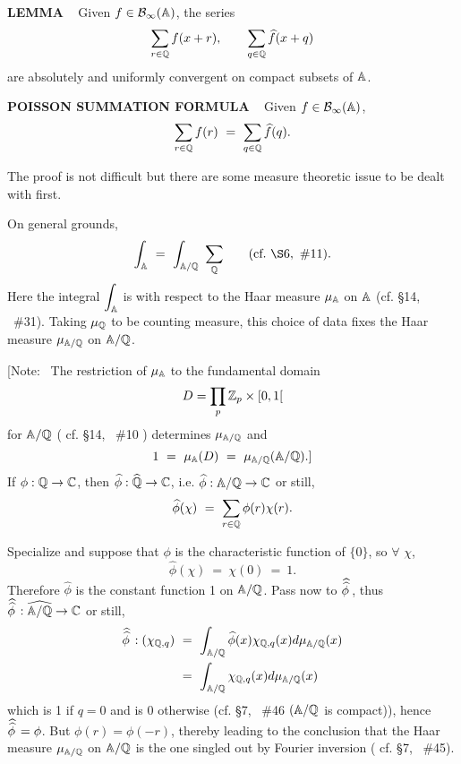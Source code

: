 \vspace{0.11cm}


\begin{x}{\small\bf LEMMA} \ %
Given $f \in \mathcal{B}_\infty(\mathbb{A})$, the series
\[
\sum_{r \in \mathbb{Q}} f(x+r),  \qquad \sum_{q \in \mathbb{Q}} \widehat{f}(x+q)
\]
are absolutely and uniformly convergent on compact subsets of $\mathbb{A}$.
\end{x}

\vspace{0.1cm}

\begin{x}{\small\bf POISSON SUMMATION FORMULA} \ %
Given $f \in \mathcal{B}_\infty(\mathbb{A})$,
\[
\sum_{r \in \mathbb{Q}} f(r) \ = \  \sum_{q \in \mathbb{Q}} \widehat{f}(q).
\]

The proof is not difficult but there are some measure theoretic issue to be dealt with first.

On general grounds, 
\[
\int_\A \ =\  \int_{\A/\Q} \ \sum_\Q	\qquad (\text{cf.} \ \S6,  \ \#11).
\]
Here the integral $\displaystyle\int_{\mathbb{A}}$ is with respect to the Haar measure $\mu_{\mathbb{A}}$ on $\mathbb{A}$ (cf. \S14, \  \#31).  
Taking $\mu_{\mathbb{Q}}$ to be counting measure, this choice of data fixes the Haar measure $\mu_{\mathbb{A}/\mathbb{Q}}$ on $\mathbb{A}/\mathbb{Q}$.

\vspace{0.1cm}

[Note: \  The restriction of $\mu_{\mathbb{A}}$ to the fundamental domain
\[
D = \prod_p \mathbb{Z}_p \times [0,1[
\]
for $\mathbb{A}/\mathbb{Q}$ ( cf. \S14, \  \#10 ) determines $\mu_{\mathbb{A}/\mathbb{Q}}$ and
\[
1 \ =\  \mu_{\mathbb{A}}(D) \ =\  \mu_{\mathbb{A}/\mathbb{Q}} (\mathbb{A}/\mathbb{Q}).]
\]
If $\phi:\mathbb{Q} \rightarrow \mathbb{C}$, then $\widehat{\phi}:\widehat{\mathbb{Q}} \rightarrow \mathbb{C}$, i.e. $\widehat{\phi}:
\mathbb{A}/\mathbb{Q} \rightarrow \mathbb{C}$ or still,
\[
\widehat{\phi}(\chi) \ = \ \sum_{r \in \mathbb{Q}} \phi(r) \chi(r).
\]


Specialize and suppose that $\phi$ is the characteristic function of $\{0\}$, so $\forall$ $\chi$,
\[
\widehat{\phi}(\chi) \ =\  \chi(0) \ =\  1.
\]
Therefore $\widehat{\phi}$ is the constant function 1 on $\mathbb{A}/\mathbb{Q}$.  
Pass now to $\widehat{\widehat{\phi}\hspace{0.059cm}}$, thus 
$\widehat{\widehat{\phi}\hspace{0.05cm}}: \widehat{\mathbb{A}/\mathbb{Q}} \rightarrow \mathbb{C}$ or still,
\begin{align*}
\widehat{\widehat{\phi}\hspace{0.05cm}}:(\chi_{\Q,q}) \ 
&=\  \int_{\A/\Q} \widehat{\phi}(x) \chi_{\Q,q} (x) d\mu_{\A/\Q}(x) \\
&=\  \int_{\A/\Q} \chi_{\Q,q} (x) d\mu_{\A/\Q}(x)
\end{align*}
which is 1 if $q = 0$ and is 0 otherwise (cf. \S7, \  \#46 $(\mathbb{A}/\mathbb{Q}$ is compact)), 
hence $\widehat{\widehat{\phi}\hspace{0.05cm}} = \phi$.  
But $\phi(r) = \phi(-r)$, thereby leading to the conclusion that the Haar measure 
$\mu_{\mathbb{A}/\mathbb{Q}}$ on $\mathbb{A}/\mathbb{Q}$ is the one singled out by Fourier inversion ( cf. \S7, \  \#45).


\end{x}
